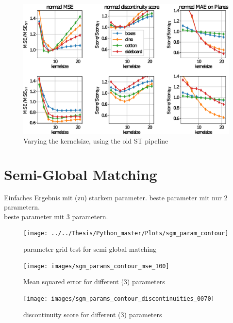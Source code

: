 \documentclass  [
  paper    = a4,
  BCOR     = 10mm,
  twoside,
  fontsize = 12pt,
  fleqn,
  toc      = bibnumbered,
  toc      = listofnumbered,
  numbers  = noendperiod,
  headings = normal,
  listof   = leveldown,
  version  = 3.03
]                                       {scrreprt}
\begin{document}
\begin{figure}
	\centering
	\includegraphics[width=1\linewidth]{images/old_outer}
	\caption[Varying kernelsize]{Varying the kernelsize, using the old ST pipeline}
	\label{fig:oldouter}
\end{figure}

\section{Semi-Global Matching}
Einfaches Ergebnis mit (zu) starkem parameter.
beste parameter mit nur 2 parametern.\\
beste parameter mit 3 parametern.\\
\begin{figure}
	\centering
	\texttt{[image: ../../Thesis/Python\_master/Plots/sgm\_param\_contour]}
	\caption[parameter grid test for semi global matching]{parameter grid test for semi global matching}
	\label{fig:sgmparamcontour}
\end{figure}

\begin{figure}
	\centering
	\texttt{[image: images/sgm\_params\_contour\_mse\_100]}
	\caption[mse_100]{Mean squared error for different (3) parameters}
	\label{fig:sgmparamscontourmse100}
\end{figure}

\begin{figure}
	\centering
	\texttt{[image: images/sgm\_params\_contour\_discontinuities\_0070]}
	\caption[discontinuities_0070]{discontinuity score for different (3) parameters}
	\label{fig:sgmparamscontourdis}
\end{figure}
\end{document}
